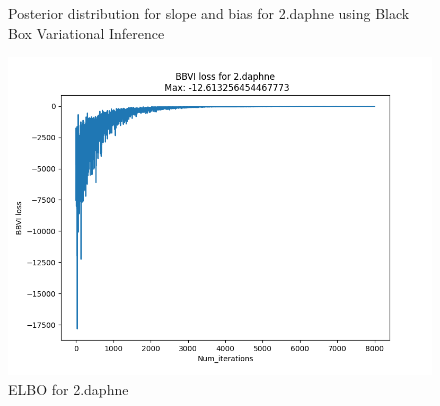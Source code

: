 \documentclass{article}
\begin{document}
\begin{enumerate}
\begin{figure}[!htp] 
    \centering
    \hfill%
        \caption{Posterior distribution for slope and bias for 2.daphne using Black Box Variational Inference}
\end{figure}

\begin{figure}[!ht]
	\centering
	\includegraphics[scale=0.5]{../figs/2_daphne_ELBO}
	\caption{ELBO for 2.daphne}
\end{figure}


\end{enumerate}
\end{document}
